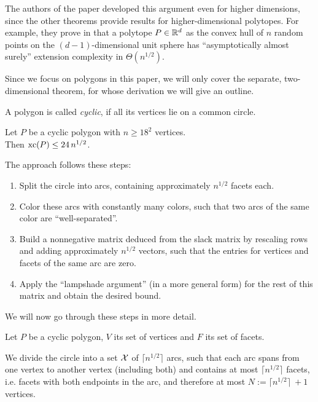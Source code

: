 The authors of the paper developed this argument even for higher dimensions, since the other theorems provide results for higher-dimensional polytopes. For example, they prove in \cite[Theorem 1.1]{shitov2020sublinear} that a polytope $P \in \mathbb{R}^d$ as the convex hull of $n$ random points on the $(d-1)$-dimensional unit sphere has ``asymptotically almost surely'' extension complexity in $\Theta(n^{1/2})$.

Since we focus on polygons in this paper, we will only cover the separate, two-dimensional theorem, for whose derivation we will give an outline.

\begin{definition}
  A polygon is called \emph{cyclic}, if all its vertices lie on a common circle.
\end{definition}

\begin{theorem}\label{theorem:cyclic-xc}
  Let $P$ be a cyclic polygon with $n \geq 18^2$ vertices.\\
  Then $\operatorname{xc}(P) \leq 24\,n^{1/2}$.
\end{theorem}

The approach follows these steps:

\begin{enumerate}
  \item Split the circle into arcs, containing approximately $n^{1/2}$ facets each.
  \item Color these arcs with constantly many colors, such that two arcs of the same color are ``well-separated''.
  \item Build a nonnegative matrix deduced from the slack matrix by rescaling rows and adding approximately $n^{1/2}$ vectors, such that the entries for vertices and facets of the same arc are zero.
  \item Apply the ``lampshade argument'' (in a more general form) for the rest of this matrix and obtain the desired bound.
\end{enumerate}

We will now go through these steps in more detail.

Let $P$ be a cyclic polygon, $V$ its set of vertices and $F$ its set of facets.

We divide the circle into a set $\mathcal{X}$ of $\lceil n^{1/2} \rceil$ arcs, such that each arc spans from one vertex to another vertex (including both) and contains at most $\lceil n^{1/2} \rceil$ facets, i.e. facets with both endpoints in the arc, and therefore at most $N := \lceil n^{1/2} \rceil\ + 1$ vertices.

